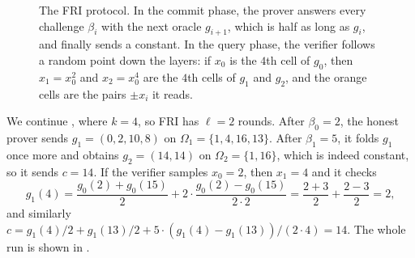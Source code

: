 \documentclass[../../book]{subfiles}
\begin{document}
\begin{figure}[ht]
{%
    }
    \caption{The FRI protocol. In the commit phase, the prover answers every challenge $\beta_i$ with the next oracle $g_{i+1}$, which is half as long as $g_i$, and finally sends a constant. In the query phase, the verifier follows a random point down the layers: if $x_0$ is the $4$th cell of $g_0$, then $x_1 = x_0^2$ and $x_2 = x_0^4$ are the $4$th cells of $g_1$ and $g_2$, and the orange cells are the pairs $\pm x_i$ it reads.}
    \label{fig:fri-protocol}
\end{figure}

\begin{example}\label{ex:fri-run}
    We continue , where $k = 4$, so FRI has $\ell = 2$ rounds.
    After $\beta_0 = 2$, the honest prover sends $g_1 = (0, 2, 10, 8)$ on $\Omega_1 = \{1, 4, 16, 13\}$.
    After $\beta_1 = 5$, it folds $g_1$ once more and obtains $g_2 = (14, 14)$ on $\Omega_2 = \{1, 16\}$, which is indeed constant, so it sends $c = 14$.
    If the verifier samples $x_0 = 2$, then $x_1 = 4$ and it checks
    \begin{equation*}
        g_1(4) = \frac{g_0(2) + g_0(15)}{2} + 2 \cdot \frac{g_0(2) - g_0(15)}{2 \cdot 2} = \frac{2 + 3}{2} + \frac{2 - 3}{2} = 2,
    \end{equation*}
    and similarly $c = g_1(4)/2 + g_1(13)/2 + 5 \cdot (g_1(4) - g_1(13))/(2 \cdot 4) = 14$.
    The whole run is shown in .
\end{example}
\end{document}
